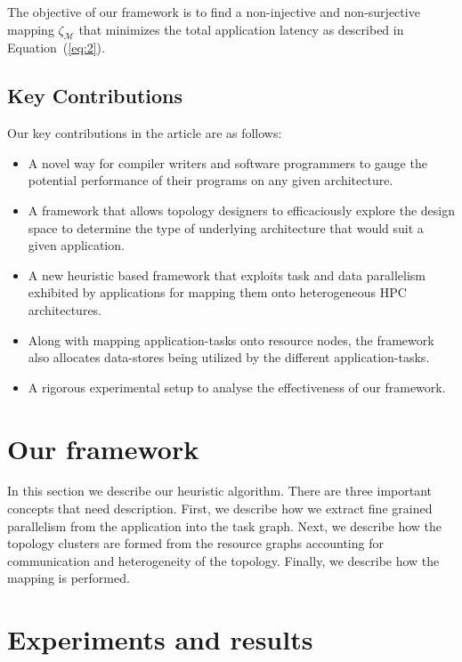 \documentclass[10pt, conference, compsocconf]{IEEEtran}
\begin{document}
The objective of our framework is to find a non-injective and
non-surjective mapping $\zeta_\mathcal{M}$ that minimizes the total
application latency as described in Equation~(\ref{eq:2}).

\subsection{Key Contributions}
Our key contributions in the article are as follows:
\begin{itemize}
\item A novel way for compiler writers and software programmers to gauge
  the potential performance of their programs on any given architecture.
\item A framework that allows topology designers to efficaciously
  explore the design space to determine the type of underlying
  architecture that would suit a given application.
\item A new heuristic based framework that exploits task and data
  parallelism exhibited by applications for mapping them onto
  heterogeneous HPC architectures.
\item Along with mapping application-tasks onto resource nodes, the
  framework also allocates data-stores being utilized by the different
  application-tasks.
\item A rigorous experimental setup to analyse the effectiveness of our
  framework.
\end{itemize}

\section{Our framework}
\label{sec:our-framework}

In this section we describe our heuristic algorithm. There are three
important concepts that need description. First, we describe how we
extract fine grained parallelism from the application into the task
graph. Next, we describe how the topology clusters are formed from the
resource graphs accounting for communication and heterogeneity of the
topology. Finally, we describe how the mapping is performed.







\section{Experiments and results}
\label{sec:experiments-results}
\end{document}
